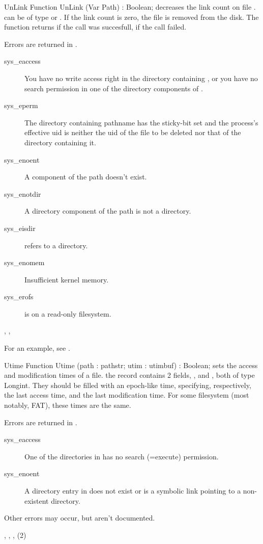 \begin{function}{UnLink}
\Declaration
Function UnLink (Var Path) : Boolean;
\Description
{} decreases the link count on file .  can be
of type  or . If the link count is zero, the
file is removed from the disk.
The function returns  if the call was succesfull,  if the call
failed.

\Errors
 Errors are returned in .
\begin{description}
\item[sys\_eaccess] You have no write access right in the directory
containing , or you have no search permission in one of the
directory components of .
\item[sys\_eperm] The  directory containing pathname has the sticky-bit 
set and the process's effective  uid is neither the uid of the 
file to be deleted nor that of the directory containing it.
\item[sys\_enoent] A component of the path doesn't exist.
\item[sys\_enotdir] A directory component of the path is not a directory.
\item[sys\_eisdir]  refers to a directory.
\item[sys\_enomem] Insufficient kernel memory.
\item[sys\_erofs]  is on a read-only filesystem. 
\end{description}

\SeeAlso
{}, ,  
\end{function}
For an example, see .

\begin{function}{Utime}
\Declaration
Function Utime (path : pathstr; utim : utimbuf) : Boolean;
\Description
{} sets the access and modification times of a file.
the  record contains 2 fields, , and ,
both of type Longint. They should be filled with an epoch-like time,
specifying, respectively, the last access time, and the last modification
time. 
For some filesystem (most notably, FAT), these times are the same. 

\Errors
Errors are returned in .
\begin{description}
\item[sys\_eaccess] One of the directories in  has no
search (=execute) permission.
\item[sys\_enoent] A directory entry in  does
not exist or is a symbolic link pointing to a non-existent directory.
\end{description}
Other errors may occur, but aren't documented.

\SeeAlso
{}, , , (2)
\end{function}

